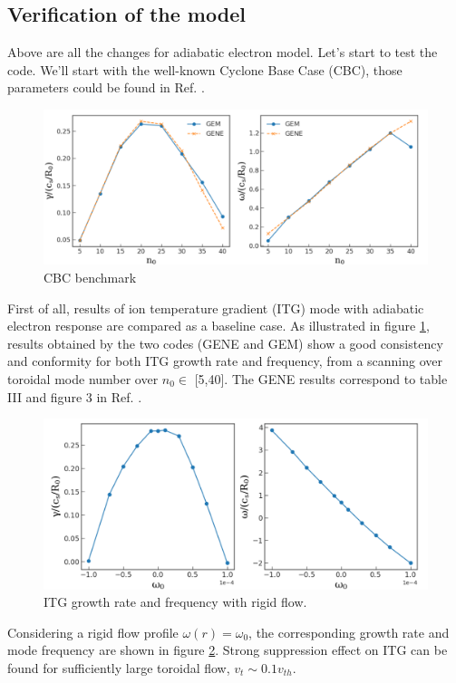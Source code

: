 \documentclass[12pt]{article}
\begin{document}
\begin{CJK*}{UTF8}{gbsn}
\newpage
\section{Verification of the model}
Above are all the changes for adiabatic electron model. Let's start to test the code. We'll start with the well-known
Cyclone Base Case (CBC), those parameters could be found in Ref. \cite{gorler}. 

\begin{figure}[htb!]
\centering
\includegraphics[width=1.\textwidth]{fig1.png}
\caption{CBC benchmark}
\label{fig1}
\end{figure}
First of all, results of ion temperature gradient (ITG) mode with adiabatic electron response are compared as a baseline
case. As illustrated in figure \ref{fig1}, results obtained by the two codes (GENE and GEM) show a good consistency and conformity 
for both ITG growth rate and frequency, from a scanning over toroidal mode number over $n_0\in$ [5,40]. The GENE results 
correspond to table III and figure 3 in Ref. \cite{gorler}. 
\begin{figure}[htb!]
\centering
\includegraphics[width=1.\textwidth]{fig2.png}
\caption{ITG growth rate and frequency with rigid flow.}
\label{fig2}
\end{figure}

Considering a rigid flow profile $\omega(r)=\omega_0$, the corresponding growth rate and mode frequency are shown in 
figure \ref{fig2}. Strong suppression effect on ITG can be found for sufficiently large toroidal flow, $v_t\sim0.1v_{th}$. 



\end{CJK*}
\end{document}

